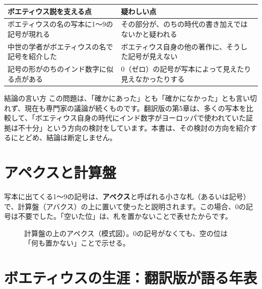 \documentclass[a4paper,11pt,openany]{ltjsbook}
\begin{document}
\begin{center}
\begin{tabular}{p{5.6cm}p{6.6cm}}
\toprule
ボエティウス説を支える点 & 疑わしい点\\
\midrule
ボエティウスの名の写本に1〜9の記号が現れる & その部分が、のちの時代の書き加えではないかと疑われる\\
中世の学者がボエティウスの名で記号を紹介した & ボエティウス自身の他の著作に、そうした記号が見えない\\
記号の形がのちのインド数字に似る点がある & 0（ゼロ）の記号が写本によって見えたり見えなかったりする\\
\bottomrule
\end{tabular}
\end{center}

\begin{notebox}{結論の言い方}
この問題は、「確かにあった」とも「確かになかった」とも言い切れず、現在も専門家の議論が続くものです。翻訳版の第5章は、多くの写本を比較して、「ボエティウス自身の時代にインド数字がヨーロッパで使われていた証拠は不十分」という方向の検討をしています。本書は、その検討の方向を紹介するにとどめ、結論は断定しません。
\end{notebox}

\section{アペクスと計算盤}

写本に出てくる1〜9の記号は、\textbf{アペクス}と呼ばれる小さな札（あるいは記号）で、計算盤（アバクス）の上に置いて使ったと説明されます。この場合、0の記号は不要でした。「空いた位」は、札を置かないことで表せたからです。

\begin{figure}[htbp]
\centering
{}
\caption{計算盤の上のアペクス（模式図）。0の記号がなくても、空の位は「何も置かない」ことで示せる。}
\end{figure}

\section{ボエティウスの生涯：翻訳版が語る年表}
\end{document}
